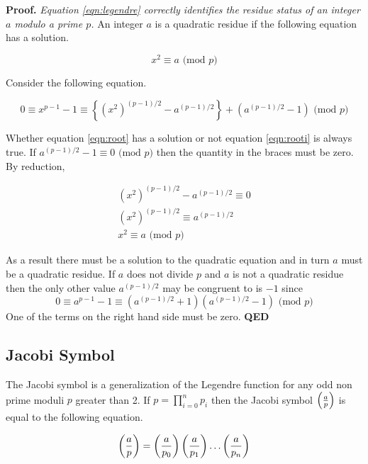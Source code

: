 \documentclass[b5paper]{book}
\begin{document}
\textbf{Proof.} \textit{Equation \ref{eqn:legendre} correctly identifies the residue status of an integer $a$ modulo a prime $p$.}
An integer $a$ is a quadratic residue if the following equation has a solution.

\begin{equation}
x^2 \equiv a \mbox{ (mod }p\mbox{)}
\label{eqn:root}
\end{equation}

Consider the following equation.

\begin{equation}
0 \equiv x^{p-1} - 1 \equiv \left \lbrace \left (x^2 \right )^{(p-1)/2} - a^{(p-1)/2} \right \rbrace + \left ( a^{(p-1)/2} - 1 \right ) \mbox{ (mod }p\mbox{)}
\label{eqn:rooti}
\end{equation}

Whether equation \ref{eqn:root} has a solution or not equation \ref{eqn:rooti} is always true.  If $a^{(p-1)/2} - 1 \equiv 0 \mbox{ (mod }p\mbox{)}$
then the quantity in the braces must be zero.  By reduction,

\begin{eqnarray}
\left (x^2 \right )^{(p-1)/2} - a^{(p-1)/2} \equiv 0  \nonumber \\
\left (x^2 \right )^{(p-1)/2} \equiv a^{(p-1)/2} \nonumber \\
x^2 \equiv a \mbox{ (mod }p\mbox{)} 
\end{eqnarray}

As a result there must be a solution to the quadratic equation and in turn $a$ must be a quadratic residue.  If $a$ does not divide $p$ and $a$
is not a quadratic residue then the only other value $a^{(p-1)/2}$ may be congruent to is $-1$ since
\begin{equation}
0 \equiv a^{p - 1} - 1 \equiv (a^{(p-1)/2} + 1)(a^{(p-1)/2} - 1) \mbox{ (mod }p\mbox{)}
\end{equation}
One of the terms on the right hand side must be zero.  \textbf{QED}

\subsection{Jacobi Symbol}
The Jacobi symbol is a generalization of the Legendre function for any odd non prime moduli $p$ greater than 2.  If $p = \prod_{i=0}^n p_i$ then
the Jacobi symbol $\left ( { a \over p } \right )$ is equal to the following equation.

\begin{equation}
\left ( { a \over p } \right ) = \left ( { a \over p_0} \right ) \left ( { a \over p_1} \right ) \ldots \left ( { a \over p_n} \right )
\end{equation}
\end{document}
